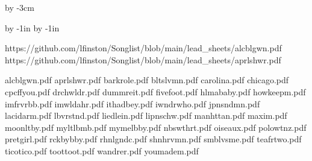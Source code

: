 







\hsize=210mm
\vsize=297mm

\parindent=0pt

\advance\vsize by -3cm

\advance\voffset by -1in
\advance\hoffset by -1in



\def\epsfsize#1#2{#1}

https://github.com/lfinston/Songlist/blob/main/lead_sheets/alcblgwn.pdf
https://github.com/lfinston/Songlist/blob/main/lead_sheets/aprlshwr.pdf



alcblgwn.pdf
aprlshwr.pdf
barkrole.pdf
bltslvmn.pdf
carolina.pdf
chicago.pdf
cpcffyou.pdf
drchwldr.pdf
dummreit.pdf
fivefoot.pdf
hlmababy.pdf
howkeepm.pdf
imfrvrbb.pdf
imwldahr.pdf
ithadbey.pdf
iwndrwho.pdf
jpnsndmn.pdf
lacidarm.pdf
lbvrstnd.pdf
liedlein.pdf
lipnschw.pdf
manhttan.pdf
maxim.pdf
moonltby.pdf
myltlbmb.pdf
mymelbby.pdf
nbswthrt.pdf
oiseaux.pdf
polowtnz.pdf
pretgirl.pdf
rckbybby.pdf
rhnlgndc.pdf
shnhrvmn.pdf
smblvsme.pdf
teafrtwo.pdf
ticotico.pdf
toottoot.pdf
wandrer.pdf
youmadem.pdf


\bye


